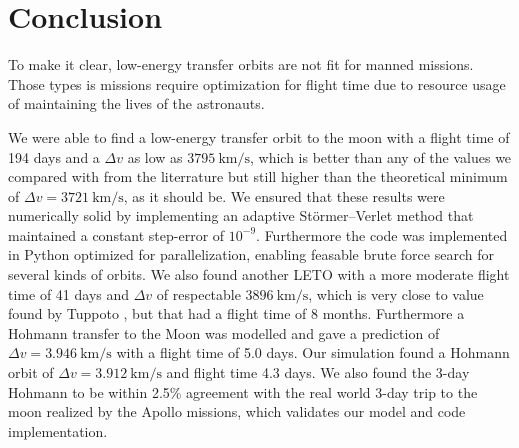 \chapter{Conclusion}
To make it clear, low-energy transfer orbits are not fit for manned missions. Those types is missions require optimization for flight time due to resource usage of maintaining the lives of the astronauts.

We were able to find a low-energy transfer orbit to the moon with a flight time of 194 days and a $\Delta v$ as low as $\SI{3795}{\km\per\s}$, which is better than any of the values we compared with from the literrature but still higher than the theoretical minimum of $\Delta v = \SI{3721}{\km\per\s}$, as it should be. We ensured that these results were numerically solid by implementing an adaptive Störmer–Verlet method that maintained a constant step-error of $10^{-9}$. Furthermore the code was implemented in Python optimized for parallelization, enabling feasable brute force search for several kinds of orbits. We also found another LETO with a more moderate flight time of 41 days and $\Delta v$ of respectable $\SI{3896}{\km\per\s}$, which is very close to value found by Tuppoto \cite{Topputo2005}, but that had a flight time of 8 months. Furthermore a Hohmann transfer to the Moon was modelled and gave a prediction of $\Delta v = \SI{3.946}{\km\per\s}$ with a flight time of 5.0 days. Our simulation found a Hohmann orbit of $\Delta v = \SI{3.912}{\km\per\s}$ and flight time 4.3 days. We also found the 3-day Hohmann to be within 2.5\% agreement with the real world 3-day trip to the moon realized by the Apollo missions, which validates our model and code implementation.